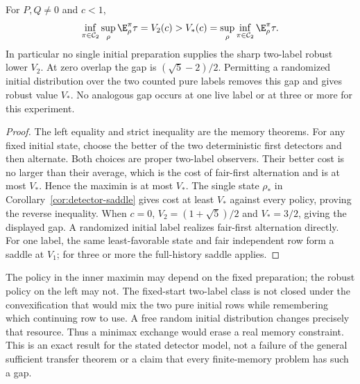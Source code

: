 \begin{corollary}\label{cor:memory-minimax-gap}
For $P,Q\ne0$ and $c<1$,
\begin{equation}\label{eq:memory-minimax-gap}
 \inf_{\pi\in\mathcal C_2}\sup_\rho\E_\rho^\pi\tau
       =V_2(c)>V_*(c)
       =\sup_\rho\inf_{\pi\in\mathcal C_2}\E_\rho^\pi\tau.
\end{equation}
In particular no single initial preparation supplies the sharp two-label robust lower $V_2$. At zero overlap the gap is $(\sqrt5-2)/2$. Permitting a randomized initial distribution over the two counted pure labels removes this gap and gives robust value $V_*$. No analogous gap occurs at one live label or at three or more for this experiment.
\end{corollary}
\begin{proof}
The left equality and strict inequality are the memory theorems. For any fixed initial state, choose the better of the two deterministic first detectors and then alternate. Both choices are proper two-label observers. Their better cost is no larger than their average, which is the cost of fair-first alternation and is at most $V_*$. Hence the maximin is at most $V_*$. The single state $\rho_*$ in Corollary~\ref{cor:detector-saddle} gives cost at least $V_*$ against every policy, proving the reverse inequality. When $c=0$, $V_2=(1+\sqrt5)/2$ and $V_*=3/2$, giving the displayed gap. A randomized initial label realizes fair-first alternation directly. For one label, the same least-favorable state and fair independent row form a saddle at $V_1$; for three or more the full-history saddle applies.
\end{proof}

The policy in the inner maximin may depend on the fixed preparation; the robust policy on the left may not. The fixed-start two-label class is not closed under the convexification that would mix the two pure initial rows while remembering which continuing row to use. A free random initial distribution changes precisely that resource. Thus a minimax exchange would erase a real memory constraint. This is an exact result for the stated detector model, not a failure of the general sufficient transfer theorem or a claim that every finite-memory problem has such a gap.
